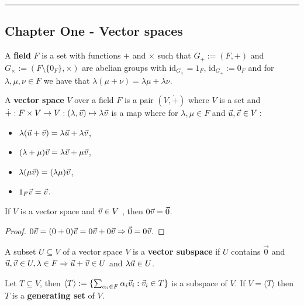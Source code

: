 \vspace{-6ex}
\noindent\rule{\linewidth}{0.5pt}\vspace{-2ex}
\begin{multicols}{2}
\section*{Chapter One - Vector spaces}
\begin{definition}
A \textbf{field} $F$ is a set with functions $+$ and $\times$ such that $G_+:=(F,+)$ and $G_\times:=(F\setminus\{0_F\},\times)$ are abelian groups with $\text{id}_{G_\times}=1_F$, $\text{id}_{G_+}:=0_F$ and for $\lambda,\mu,\nu\in F$ we have that $\lambda(\mu+\nu) = \lambda\mu + \lambda\nu$.
\end{definition}

\begin{definition}
A \textbf{vector space} $V$ over a field $F$ is a pair $(V,\dot{+})$ where $V$ is a set and $\dot{+}:F\times V\to V:(\lambda,\vec{v})\mapsto\lambda\vec{v}$ is a map where for $\lambda,\mu\in F$ and $\vec{u},\vec{v}\in V:$\vspace{-2ex}
    \begin{multicols}{2}
    \begin{itemize}
        \item{$\lambda(\vec{u}+\vec{v}) = \lambda\vec{u} + \lambda\vec{v}$,}
        \item{$(\lambda+\mu)\vec{v} = \lambda\vec{v} + \mu\vec{v}$,}
        \item{$\lambda(\mu\vec{v})=(\lambda\mu)\vec{v}$,}
        \item{$1_F\vec{v}=\vec{v}$.}
    \end{itemize}
    \end{multicols}
\end{definition}

\begin{theorem}[1.2.2]
If $V$ is a vector space and $\vec{v}\in V$ , then $0\vec{v} = \vec{0}$.
\end{theorem}
\begin{proof}
$0\vec{v} = (0 + 0)\vec{v} = 0\vec{v} + 0\vec{v} \Rightarrow  \vec{0} = 0\vec{v}$.
\end{proof}

\begin{definition}
A subset $U\subseteq V$ of a vector space $V$ is a \textbf{vector subspace} if $U$ contains $\vec{0}$ and  $\vec{u},\vec{v}\in U,\lambda\in F\Rightarrow \vec{u}+\vec{v}\in U$ and $\lambda\vec{u} \in U$.
\end{definition}

\begin{theorem}
Let $T\subseteq V$, then $\langle T\rangle := \{\sum_{\alpha_i\in F}\alpha_i\vec{v}_i : \vec{v}_i\in T\}$ is a subspace of $V$. If $V=\langle T\rangle$ then $T$ is a \textbf{generating set} of $V$.
\end{theorem}


\end{multicols}
